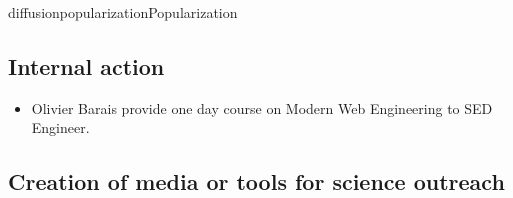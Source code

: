 \documentclass{ra2018}
\begin{document}
\begin{module}{diffusion}{popularization}{Popularization}
\subsection{Internal action}
\begin{itemize}
\item Olivier Barais provide one day course on Modern Web Engineering to SED Engineer. 
\end{itemize}


\subsection{Creation of media or tools for science outreach}




\end{module}


\end{document}
